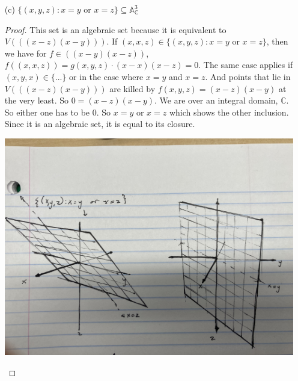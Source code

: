 \documentclass{article}
\begin{document}
\begin{itemize}
        \item [(c)] $\{(x, y, z) : x = y \text{ or } x = z\} \subseteq \mathbb{A}^{3}_{\mathbb{C}}$
            \begin{proof}
                This set is an algebraic set because it is equivalent to $V(((x - z)(x - y)))$. If $(x, x, z) \in \{(x, y, z) : x = y \text{ or } x = z\}$, then we have for $f \in ((x - y)(x - z))$, $f((x, x, z)) = g(x, y, z) \cdot (x - x)(x - z) = 0$. The same case applies if $(x, y, x) \in \{...\}$ or in the case where $x = y$ and $x = z$. And points that lie in $V(((x - z)(x - y)))$ are killed by $f(x, y, z) = (x - z)(x - y)$ at the very least. So $0 = (x - z)(x - y)$. We are over an integral domain, $\mathbb{C}$. So either one has to be $0$. So $x = y$ or $x = z$ which shows the other inclusion. Since it is an algebraic set, it is equal to its closure.
                    \begin{center}
                        \includegraphics[scale=.07]{second}
                    \end{center}
            \end{proof}
    \end{itemize}
\end{document}
